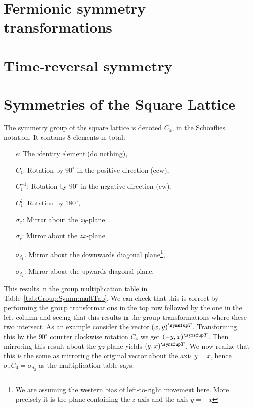 \section{Fermionic symmetry transformations}

\section{Time-reversal symmetry}

\section{Symmetries of the Square Lattice}
\label{sec:Group:Symm}

The symmetry group of the square lattice is denoted $C_{4v}$ in the Sch\"onflies notation. It contains $8$ elements in total:
\begin{itemize}
    \item[$e$:] The identity element (do nothing),
    \item[$C_4$:] Rotation by $90^\circ$ in the positive direction (ccw),
    \item[$C_4^{-1}$:] Rotation by $90^\circ$ in the negative direction (cw),
    \item[$C_4^2$:] Rotation by $180^\circ$,
    \item[$\sigma_x$:] Mirror about the $zy$-plane,
    \item[$\sigma_y$:] Mirror about the $zx$-plane,
    \item[$\sigma_{d_1}$:] Mirror about the downwards diagonal plane\footnote{We are assuming the western bias of left-to-right movement
        here. More precisely it is the plane containing the $z$ axis and the axis $y=-x$},
    \item[$\sigma_{d_2}$:] Mirror about the upwards diagonal plane.
\end{itemize}
This results in the group multiplication table in Table~\ref{tab:Group:Symm:multTab}. We can check that this is correct by
performing the group transformations in the top row followed by the one in the left column and seeing that this results
in the group transformations where these two intersect. As an example consider the vector $(x,y)^\trans$. Transforming this
by the $90^\circ$ counter clockwise rotation $C_4$ we get $(-y,x)^\trans$. Then mirroring this result about the $yz$-plane
yields $(y,x)^\trans$. We now realize that this is the same as mirroring the original vector about the axis $y=x$, hence
$\sigma_xC_4=\sigma_{d_2}$ as the multiplication table says.
